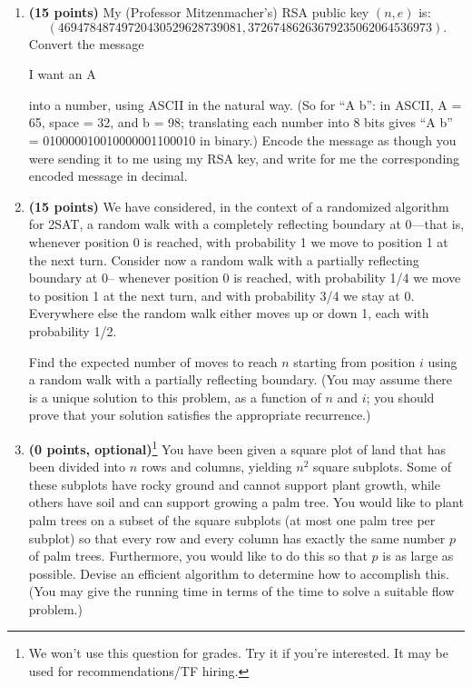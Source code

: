 \documentclass[11pt]{article}
\begin{document}
\begin{enumerate}

\item 
{\bf (15 points)}
My (Professor Mitzenmacher's) RSA public key $(n,e)$ is:
$$(46947848749720430529628739081,37267486263679235062064536973).$$
Convert the message
\smallskip
\begin{center}
I want an A
\end{center}
\smallskip
into a number, using ASCII in the natural way.  (So for ``A b'':
in ASCII, A = 65, space = 32, and b = 98; translating each number
into 8 bits gives ``A b'' = 010000010010000001100010 in binary.)
Encode the message as though you were sending it to me using my RSA
key, and write for me the corresponding encoded message in decimal.

\item
{\bf (15 points)}
We have considered, in the context of a randomized algorithm for
2SAT, a random walk with a completely reflecting
boundary at 0---that is, whenever position 0 is reached, with probability
1 we move to position 1 at the next turn.  Consider now a random walk
with a partially reflecting boundary at 0-- whenever position 0 is
reached, with probability 1/4 we move to position 1 at the next turn,
and with probability 3/4 we stay at 0.  Everywhere else the random walk
either moves up or down 1, each with probability 1/2.

Find the expected number of moves to reach $n$ starting from position $i$
using a random walk with a partially reflecting boundary.  (You may assume
there is a unique solution to this problem, as a function of $n$ and $i$;
you should prove that your solution satisfies the appropriate recurrence.)

\item 
{\bf (0 points, optional)}\footnote{We won't use this question for grades. Try it if you're interested. 
It may be used for recommendations/TF hiring.}
You have been given a square plot of land that has been divided into
$n$ rows and columns, yielding $n^2$ square subplots. Some of these
subplots have rocky ground and cannot support plant growth, while
others have soil and can support growing a palm tree. You would like
to plant palm trees on a subset of the square subplots 
(at most one palm tree per subplot) so that every
row and every column has exactly the same number $p$ of palm
trees. Furthermore, you would like to do this so that $p$ is as large
as possible. Devise an efficient algorithm to determine how to
accomplish this.  (You may give the running time in terms of the 
time to solve a suitable flow problem.)




\end{enumerate}
\end{document}
